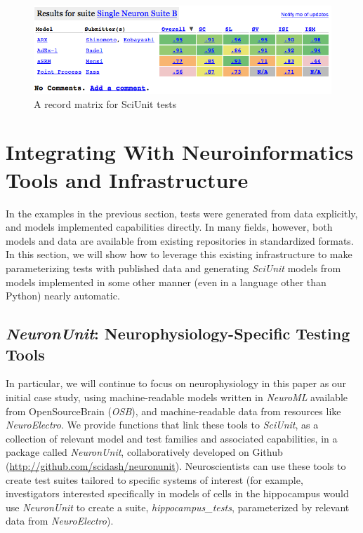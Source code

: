 \documentclass{frontiersSCNS}
\begin{document}
\begin{figure}%
\includegraphics[scale=0.65]{table.png}
\caption{A record matrix for SciUnit tests}
\label{fig:scidash_matrix}
\vspace{-5px}
\end{figure}
\vspace{-10px}
\leavevmode

\section{Integrating With Neuroinformatics Tools and Infrastructure}\label{sec:neuronunit}
In the examples in the previous section, tests were generated from data explicitly, and models implemented capabilities directly. In many fields, however, both models and data are available from existing  repositories in standardized formats. In this section, we will show how to leverage this existing infrastructure to make parameterizing tests with published data and generating \textit{SciUnit} models from models implemented in some other manner (even in a language other than Python) nearly automatic.

\subsection{\textit{NeuronUnit}: Neurophysiology-Specific Testing Tools}\label{sec:neuronunit_acitivities}
In particular, we will continue to focus on neurophysiology in this paper as our initial case study, using machine-readable models written in \textit{NeuroML} available from OpenSourceBrain (\textit{OSB}), and machine-readable data from resources like \textit{NeuroElectro}. We provide functions that  link these tools to \textit{SciUnit}, as a collection of relevant model and test families and associated capabilities, in a package called \textit{NeuronUnit}, collaboratively developed on Github (\url{http://github.com/scidash/neuronunit}).  Neuroscientists can use these tools to create test suites tailored to specific systems of interest (for example, investigators interested specifically in models of cells in the hippocampus would use \textit{NeuronUnit} to create a suite, \textit{hippocampus\_tests}, parameterized by relevant data from \textit{NeuroElectro}).
\end{document}
